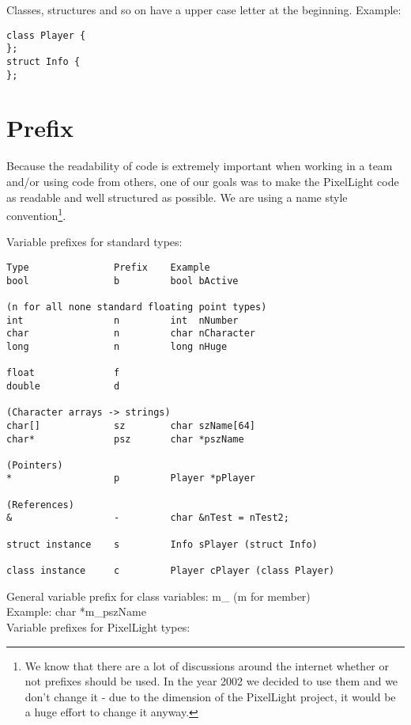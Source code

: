 Classes, structures and so on have a upper case letter at the beginning. Example:

\begin{lstlisting}[caption=Name convention]
class Player {
};
struct Info {
};
\end{lstlisting}




\section{Prefix}
Because the readability of code is extremely important when working in a team and/or using code from others, one of our goals was to make the PixelLight code as readable and well structured as possible. We are using a name style convention\footnote{We know that there are a lot of discussions around the internet whether or not prefixes should be used. In the year 2002 we decided to use them and we don't change it - due to the dimension of the PixelLight project, it would be a huge effort to change it anyway.}.

Variable prefixes for standard types:

\begin{lstlisting}[caption=Variable prefixes for standard types]
Type               Prefix    Example
bool               b         bool bActive

(n for all none standard floating point types)
int                n         int  nNumber
char               n         char nCharacter
long               n         long nHuge

float              f
double             d

(Character arrays -> strings)
char[]             sz        char szName[64]
char*              psz       char *pszName

(Pointers)
*                  p         Player *pPlayer

(References)
&                  -         char &nTest = nTest2;

struct instance    s         Info sPlayer (struct Info)

class instance     c         Player cPlayer (class Player)
\end{lstlisting}

General variable prefix for class variables:
m\_ (m for member)\\
Example: char *m\_pszName\\

Variable prefixes for PixelLight types:

